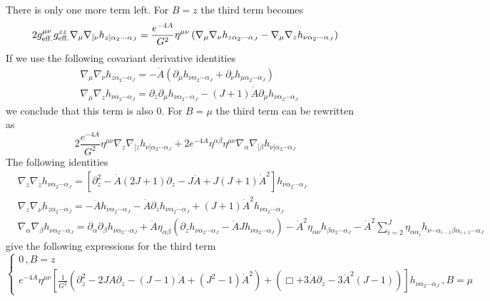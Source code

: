 \documentclass[10 pt]{article}
\begin{document}
There is only one more term left. For $B = z$ the third term becomes
\begin{equation}
2 g^{\mu \nu}_{\rm{eff.}} g^{zz}_{\rm{eff.}} \nabla_\mu \nabla_{[\nu}h_{z] \alpha_2 \cdots \alpha_J} = \frac{e^{-4A}}{G^2} \eta^{\mu \nu} \left( \nabla_\mu \nabla_\nu h_{z \alpha_2 \cdots \alpha_J} -  \nabla_\mu \nabla_z h_{\nu \alpha_2 \cdots \alpha_J}  \right)
\end{equation}
If we use the following covariant derivative identities
\begin{align}
&\nabla_\mu \nabla_\nu h_{z \alpha_2 \cdots \alpha_J} = -\dot{A} \left( \partial_\mu h_{\nu \alpha_2 \cdots \alpha_J} + \partial_\nu h_{\mu \alpha_2 \cdots \alpha_J} \right) \\
&\nabla_\mu \nabla_z h_{\nu \alpha_2 \cdots \alpha_J} = \partial_z \partial_\mu h_{\nu \alpha_2 \cdots \alpha_J} - \left(J+1\right) \dot{A} \partial_\mu h_{\nu \alpha_2 \cdots \alpha_J}
\end{align}
we conclude that this term is also 0. For $B = \mu$ the third term can be rewritten as
\begin{equation}
2 \frac{e^{-4A}}{G^2} \eta^{\mu \nu} \nabla_{z} \nabla_{[z} h_{\nu] \alpha_2 \cdots \alpha_J} + 2 e^{-4A} \eta^{\alpha \beta} \eta^{\mu \nu} \nabla_{\alpha} \nabla_{[\beta} h_{\nu] \alpha_2 \cdots \alpha_J}
\end{equation}
The following identities
\begin{align}
&\nabla_z \nabla_z h_{\nu \alpha_2 \cdots \alpha_J} = \left[ \partial_z^2 - \dot{A} \left(2 J+1\right) \partial_z - J \ddot{A} + J \left(J+1\right) {\dot{A}}^2 \right] h_{\nu \alpha_2 \cdots \alpha_J} \\
&\nabla_z \nabla_\nu h_{z \alpha_2 \cdots \alpha_J} = - \ddot{A} h_{\nu \alpha_2 \cdots \alpha_J} - \dot{A} \partial_z h_{\nu \alpha_2 \cdots \alpha_J} + \left(J+1\right){\dot{A}}^2 h_{\nu \alpha_2 \cdots \alpha_J} \\
& \nabla_\alpha \nabla_\beta h_{\nu \alpha_2 \cdots \alpha_J} = \partial_\alpha \partial_\beta h_{\nu \alpha_2 \cdots \alpha_J} + \dot{A} \eta_{\alpha \beta} \left( \partial_z h_{\nu \alpha_2 \cdots \alpha_J} - \dot{A} J h_{\nu \alpha_2 \cdots \alpha_J}\right) - {\dot{A}}^2 \eta_{\alpha \nu} h_{\beta \alpha_2 \cdots \alpha_J} - {\dot{A}}^2 \sum_{i=2}^J \eta_{\alpha \alpha_i} h_{\nu \cdots \alpha_{i-1} \beta \alpha_{i+1} \cdots \alpha_J}
\end{align}
give the following expressions for the third term
\begin{equation}
\begin{cases}
0 \, ,B = z \\
e^{-4A} \eta^{\mu \nu} \left[\frac{1}{G^2}\left(\partial_z^2 - 2 J \dot{A} \partial_z - \left(J-1\right) \ddot{A} + \left(J^2-1\right) {\dot{A}}^2 \right)+ \left( \Box + 3\dot{A} \partial_z - 3 {\dot{A}}^2 \left(J-1\right) \right)  \right]h_{\nu \alpha_2 \cdots \alpha_J} \, , B = \mu
\end{cases}
\end{equation}
\end{document}
